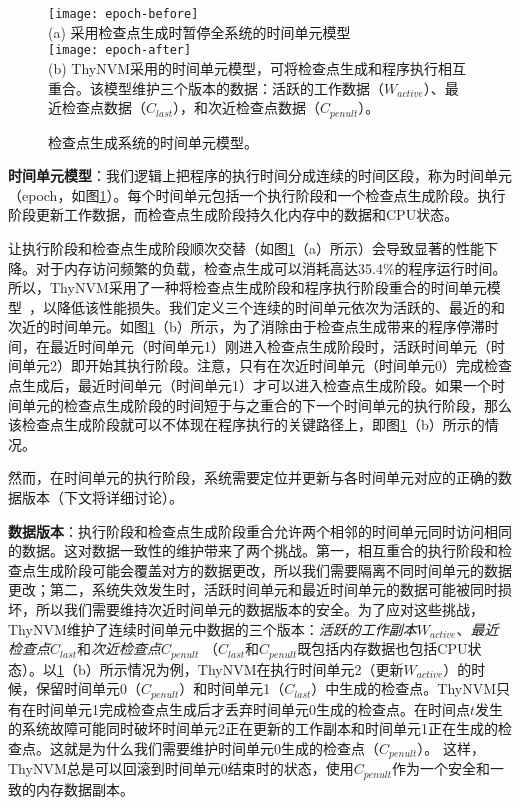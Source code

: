 \begin{figure}[!h]
\centering
\texttt{[image: epoch-before]}\\
{\small (a) 采用检查点生成时暂停全系统的时间单元模型}\\
\vspace{10pt}
\texttt{[image: epoch-after]}\\
{\small (b) ThyNVM采用的时间单元模型，可将检查点生成和程序执行相互重合。该模型维护三个版本的数据：活跃的工作数据（$W_{active}$）、最近检查点数据（$C_{last}$），和次近检查点数据（$C_{penult}$）。\hfill}
\caption{检查点生成系统的时间单元模型。}
\label{fig-epoch}
\end{figure}

\textbf{时间单元模型}：我们逻辑上把程序的执行时间分成连续的时间区段，称为时间单元（epoch，如图\ref{fig-epoch}）。每个时间单元包括一个执行阶段和一个检查点生成阶段。执行阶段更新工作数据，而检查点生成阶段持久化内存中的数据和CPU状态。

让执行阶段和检查点生成阶段顺次交替（如图\ref{fig-epoch}（a）所示）会导致显著的性能下降。对于内存访问频繁的负载，检查点生成可以消耗高达35.4\%的程序运行时间。所以，ThyNVM采用了一种将检查点生成阶段和程序执行阶段重合的时间单元模型~\cite{1003568}，以降低该性能损失。我们定义三个连续的时间单元依次为活跃的、最近的和次近的时间单元。如图\ref{fig-epoch}（b）所示，为了消除由于检查点生成带来的程序停滞时间，在最近时间单元（时间单元1）刚进入检查点生成阶段时，活跃时间单元（时间单元2）即开始其执行阶段。注意，只有在次近时间单元（时间单元0）完成检查点生成后，最近时间单元（时间单元1）才可以进入检查点生成阶段。如果一个时间单元的检查点生成阶段的时间短于与之重合的下一个时间单元的执行阶段，那么该检查点生成阶段就可以不体现在程序执行的关键路径上，即图\ref{fig-epoch}（b）所示的情况。

然而，在时间单元的执行阶段，系统需要定位并更新与各时间单元对应的正确的数据版本（下文将详细讨论）。

\textbf{数据版本}：执行阶段和检查点生成阶段重合允许两个相邻的时间单元同时访问相同的数据。这对数据一致性的维护带来了两个挑战。第一，相互重合的执行阶段和检查点生成阶段可能会覆盖对方的数据更改，所以我们需要隔离不同时间单元的数据更改；第二，系统失效发生时，活跃时间单元和最近时间单元的数据可能被同时损坏，所以我们需要维持次近时间单元的数据版本的安全。为了应对这些挑战，ThyNVM维护了连续时间单元中数据的三个版本：\emph{活跃的工作副本$W_{active}$}、\emph{最近检查点$C_{last}$}和\emph{次近检查点$C_{penult}$} （$C_{last}$和$C_{penult}$既包括内存数据也包括CPU状态）。以\ref{fig-epoch}（b）所示情况为例，ThyNVM在执行时间单元2（更新$W_{active}$）的时候，保留时间单元0（$C_{penult}$）和时间单元1（$C_{last}$）中生成的检查点。ThyNVM只有在时间单元1完成检查点生成后才丢弃时间单元0生成的检查点。在时间点$t$发生的系统故障可能同时破坏时间单元2正在更新的工作副本和时间单元1正在生成的检查点。这就是为什么我们需要维护时间单元0生成的检查点（$C_{penult}$）。
这样，ThyNVM总是可以回滚到时间单元0结束时的状态，使用$C_{penult}$作为一个安全和一致的内存数据副本。

